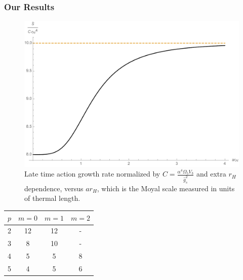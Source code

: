 \documentclass[10pt]{beamer}
\begin{document}
\begin{frame}
\frametitle{Our Results}

\begin{figure}[htbp]
    \begin{center}
        \includegraphics[scale=0.3]{LateTime}
    \end{center}
    \caption{Late time action growth rate normalized by $C=\frac{\alpha^4 \Omega_5 V_3}{\hat{g}_s^2}$ and extra $r_H$ dependence, versus $a r_H$, which is the Moyal scale measured in units of thermal length.} 
    \label{fig:LateTime}
\end{figure}

\begin{table}
    \centering
    \begin{tabular}{l | c  c  c }
        $p$ & $m=0$ & $m=1$ & $m=2$ \\
        \hline
        2 & 12 & 12 & - \\
        3 & 8 & 10 & - \\
        4 & 5 & 5 & 8 \\
        5 & 4 & 5 & 6 \\
    \end{tabular}
\end{table}

\end{frame}
\end{document}
